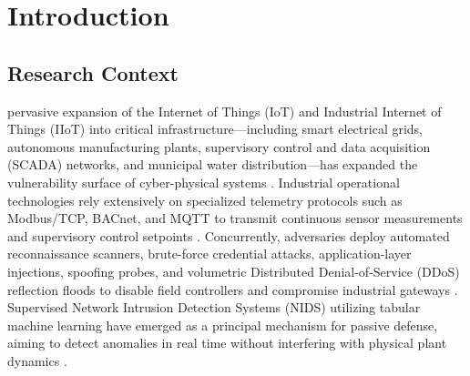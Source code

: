 \documentclass[10pt,journal,twocolumn]{IEEEtran}
\begin{document}
\section{Introduction}

\subsection{Research Context}
 pervasive expansion of the Internet of Things (IoT) and Industrial Internet of Things (IIoT) into critical infrastructure---including smart electrical grids, autonomous manufacturing plants, supervisory control and data acquisition (SCADA) networks, and municipal water distribution---has expanded the vulnerability surface of cyber-physical systems \cite{ref1,ref3,ref8}. Industrial operational technologies rely extensively on specialized telemetry protocols such as Modbus/TCP, BACnet, and MQTT to transmit continuous sensor measurements and supervisory control setpoints \cite{ref3,ref5}. Concurrently, adversaries deploy automated reconnaissance scanners, brute-force credential attacks, application-layer injections, spoofing probes, and volumetric Distributed Denial-of-Service (DDoS) reflection floods to disable field controllers and compromise industrial gateways \cite{ref4,ref6}. Supervised Network Intrusion Detection Systems (NIDS) utilizing tabular machine learning have emerged as a principal mechanism for passive defense, aiming to detect anomalies in real time without interfering with physical plant dynamics \cite{ref7,ref8,ref9}.
\end{document}
